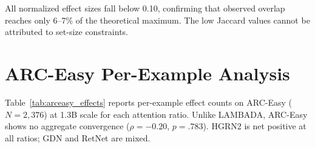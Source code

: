 \begin{table}[ht]
\centering
\small
\caption{Normalized Jaccard effect size for each architecture pair (1.3B h3-1 on LAMBADA). $J_{\max}$: theoretical upper bound given set sizes. Normalized ES: fraction of achievable overlap above chance.}
\label{tab:normalized_es}
\end{table}

All normalized effect sizes fall below 0.10, confirming that observed overlap reaches only 6--7\% of the theoretical maximum. The low Jaccard values cannot be attributed to set-size constraints.

\section{ARC-Easy Per-Example Analysis}\label{app:arceasy}

Table~\ref{tab:arceasy_effects} reports per-example effect counts on ARC-Easy ($N = 2{,}376$) at 1.3B scale for each attention ratio. Unlike LAMBADA, ARC-Easy shows no aggregate convergence ($\rho = -0.20$, $p = .783$). HGRN2 is net positive at all ratios; GDN and RetNet are mixed.

